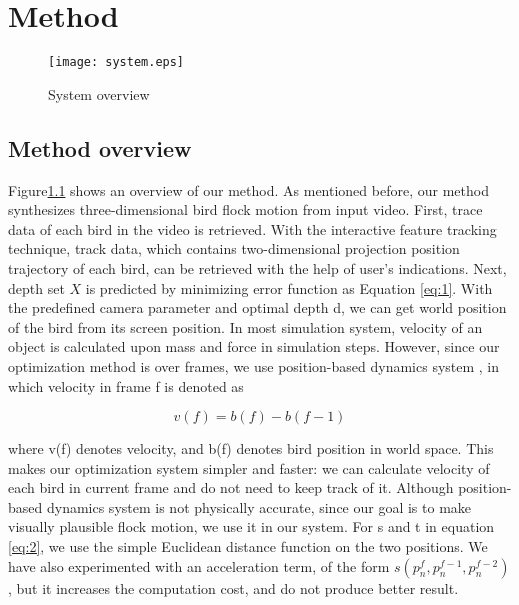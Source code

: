 \chapter{Method}


\begin{figure}[h]
 \begin{center}
  \texttt{[image: system.eps]}
 \end{center}
 \caption{System overview}
 \label{figure:system}
\end{figure}


\section{Method overview}


Figure\ref{figure:system}  shows an overview of our method. As mentioned before, our method synthesizes three-dimensional bird flock motion from input video. First, trace data of each bird in the video is retrieved. With the interactive feature tracking technique, track data, which contains two-dimensional projection position trajectory of each bird, can be retrieved with the help of user's indications. Next, depth set $X$ is predicted by minimizing error function as Equation \ref{eq:1}. With the predefined camera parameter and optimal depth d, we can get world position of the bird from its screen position.
In most simulation system, velocity of an object is calculated upon mass and force in simulation steps. However, since our optimization method is over frames, we use position-based dynamics system \cite{PBD}, in which velocity in frame f is denoted as


\begin{equation}\label{eq:3}
 v(f) = b(f)-b(f-1)
\end{equation}


where v(f) denotes velocity, and b(f) denotes bird position in world space. This makes our optimization system simpler and faster: we can calculate velocity of each bird in current frame and do not need to keep track of it. Although position-based dynamics system is not physically accurate, since our goal is to make visually plausible flock motion, we use it in our system.
For s and t in equation \ref{eq:2}, we use the simple Euclidean distance function on the two positions. We have also experimented with an acceleration term, of the form $s(p_n^f, p_n^{f-1}, p_n^{f-2})$, but it increases the computation cost, and do not produce better result.


